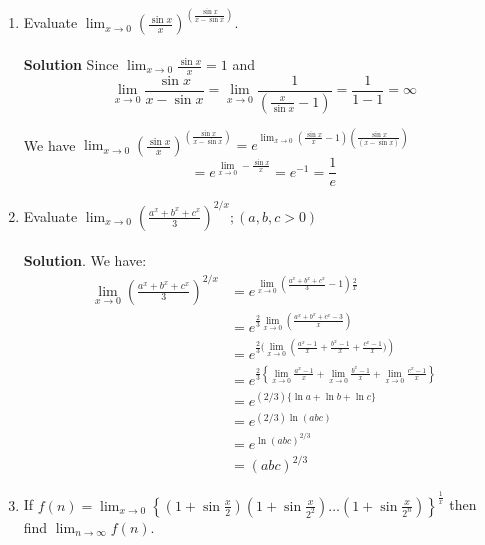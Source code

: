 \begin{enumerate}
    \item Evaluate $\lim _{x \rightarrow 0}\left(\frac{\sin x}{x}\right)^{\left(\frac{\sin x}{x-\sin x}\right)}$.\\\\
\textbf{Solution}
Since $\lim _{x \rightarrow 0} \frac{\sin x}{x}=1$
and
$$
\lim _{x \rightarrow 0} \frac{\sin x}{x-\sin x}=\lim _{x \rightarrow 0} \frac{1}{\left(\frac{x}{\sin x}-1\right)}=\frac{1}{1-1}=\infty
$$

We have $\lim _{x \rightarrow 0}\left(\frac{\sin x}{x}\right)^{\left(\frac{\sin x}{x-\sin x}\right)}=e^{\lim _{x \rightarrow 0}\left(\frac{\sin x}{x}-1\right)\left(\frac{\sin x}{(x-\sin x)}\right)}$
$$
=e^{\lim _{x \rightarrow 0}-\frac{\sin x}{x}}=e^{-1}=\frac{1}{e}
$$

\item Evaluate $\lim _{x \rightarrow 0}\left(\frac{a^x+b^x+c^x}{3}\right)^{2 / x} ;(a, b, c>0)$\\\\

\textbf{Solution}.
We have:
$$
\begin{aligned}
\lim _{x \rightarrow 0}\left(\frac{a^x+b^x+c^x}{3}\right)^{2 / x} & =e^{\lim _{x \rightarrow 0}\left(\frac{a^x+b^x+c^x}{3}-1\right) \frac{2}{x}} \\
& =e^{\frac{2}{3} \lim _{x \rightarrow 0}\left(\frac{a^x+b^x+c^x-3}{x}\right)} \\
& =e^{\frac{2}{3} (\lim _{x \rightarrow 0}\left(\frac{a^x-1}{x}+\frac{b^x-1}{x}+\frac{c^x-1}{x})\right)}\\
& =e^{\frac{2}{3}\left\{\lim _{x \rightarrow 0} \frac{a^x-1}{x}+\lim _{x \rightarrow 0} \frac{b^x-1}{x}+\lim _{x \rightarrow 0} \frac{c^x-1}{x}\right\}} \\
& =e^{(2 / 3)\{\ln a+\ln b+\ln c\}} \\
& =e^{(2 / 3) \ln (a b c)} \\
& =e^{\ln (a b c)^{2 / 3}} \\
& =(a b c)^{2 / 3}
\end{aligned}
$$
\item 
If $f(n)=\lim _{x \rightarrow 0}\left\{\left(1+\sin \frac{x}{2}\right)\left(1+\sin \frac{x}{2^2}\right) \ldots\left(1+\sin \frac{x}{2^n}\right)\right\}^{\frac{1}{x}}$ then find $\lim _{n \rightarrow \infty} f(n)$.\\\\


\end{enumerate}
